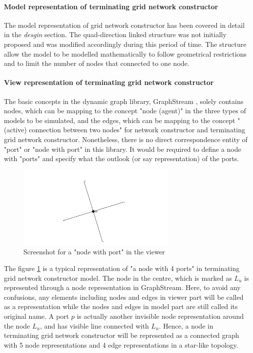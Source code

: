\paragraph{Model representation of terminating grid network constructor}
The model representation of grid network constructor has been covered in detail in the \textit{desgin} section. The
quad-direction linked structure was not initially proposed and was modified accordingly during this period of time.
The structure allow the model to be modelled mathematically to follow geometrical restrictions
and to limit the number of nodes that connected to one node.
\paragraph{View representation of terminating grid network constructor}
The basic concepts in the dynamic graph library, GraphStream \cite{GraphStream}, solely contains nodes, which can be mapping to the concept "node (agent)" in
the three types of models to be simulated, and the edges, which can be mapping to the concept "(active) connection between two nodes" for network constructor and
terminating grid network constructor. Nonetheless, there is no direct correspondence entity of "port" or "node with port" in this library.
It would be required to define a node with "ports" and specify what the outlook (or say representation) of the ports.

\begin{figure}[H]
\begin{center}
\includegraphics[width =0.7\textwidth]{context/diagram/GridNodeRepCapture.png}
\caption{Screenshot for a "node with port" in the viewer}
\label{capture_gridrep}
\end{center}
\end{figure}

\par\noindent
The figure \ref{capture_gridrep} is a typical representation of "a node with 4 ports" in terminating grid network constructor model. The node in the centre, which
is marked as $L_{u}$ is represented through a node representation in GraphStream. Here, to avoid any confusions, any elements including nodes and edges in
viewer part will be called as a representation while the nodes and edges in model part are still called its original name.
A port $p$ is actually another invisible node representation around the node $L_{u}$, and has visible line connected with $L_{u}$. Hence, a node
in terminating grid network constructor will be represented as a connected graph with 5 node representations and 4 edge representations in a star-like topology.

